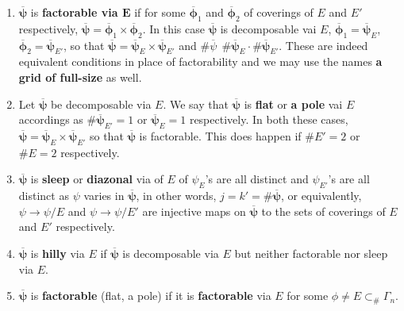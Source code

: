 \documentclass[a4paper,12pt]{article}
\theoremstyle{definition}
\theoremstyle{underlinethm}
\theoremstyle{definition}
\begin{document}
\begin{enumerate}[label=(\roman*)]

\item $\overline{\boldsymbol{\psi}}$ is \textbf{factorable via $\mathbf{E}$} if for some $\overline{\boldsymbol{\phi}}_{1}$ and $\overline{\boldsymbol{\phi}}_{2}$ of coverings of $E$ and $E'$ respectively, $\overline{\boldsymbol{\psi}} = \overline{\boldsymbol{\phi}}_{1} \times \overline{\boldsymbol{\phi}}_{2}$. In this case $\overline{\boldsymbol{\psi}}$ is decomposable vai $E$, $\overline{\boldsymbol{\phi}}_{1}= \overline{\boldsymbol\psi}_{E}$, $\overline{\boldsymbol{\phi}}_{2}= \overline{\boldsymbol\psi}_{E'}$, so that $\overline{\boldsymbol\psi}= \overline{\boldsymbol\psi}_{E} \times \overline{\boldsymbol\psi}_{E'}$ and $\# \overline{\psi}~~\# \overline{\boldsymbol\psi}_{E} \cdot \# \overline{\boldsymbol\psi}_{E'}$. These are indeed equivalent conditions in place of factorability and we may use the names \textbf{a grid of full-size} as well.

\item Let $\overline{\boldsymbol{\psi}}$ be decomposable via $E$. We say that $\overline{\boldsymbol{\psi}}$ is \textbf{flat} or \textbf{a pole} vai $E$  accordings  as $\# \overline{\boldsymbol{\psi}}_{E'} =1$ or $\overline{\boldsymbol{\psi}}_{E}=1$ respectively. In both these cases, $\overline{\boldsymbol{\psi}} = \overline{\boldsymbol{\psi}}_{E} \times \overline{\boldsymbol{\psi}}_{E'}$ so that $\overline{\boldsymbol{\psi}}$ is factorable. This does happen if $\#E'=2$ or $\# E=2$ respectively.

\item $\overline{\boldsymbol{\psi}}$ is \textbf{sleep} or \textbf{diazonal} via of $E$ of $\psi_{E}$'s are all distinct and $\psi_{E'}$'s are all distinct as $\psi$ varies in $\overline{\boldsymbol{\psi}}$, in other words, $j=k' = \# \overline{\boldsymbol{\psi}}$, or equivalently, $\psi \longrightarrow \psi/E$ and $\psi \longrightarrow \psi/E'$ are injective maps on $\overline{\boldsymbol{\psi}}$ to the sets of coverings of $E$ and $E'$ respectively.

\item $\overline{\boldsymbol{\psi}}$ is \textbf{hilly} via $E$ if $\overline{\boldsymbol{\psi}}$ is decomposable via $E$ but neither factorable nor sleep via $E$.

\item $\overline{\boldsymbol{\psi}}$ is \textbf{factorable} (flat, a pole) if it is \textbf{factorable} via $E$ for some $\phi \neq E \subset_{\#} \Gamma_{n}$.

\end{enumerate}
\end{document}

